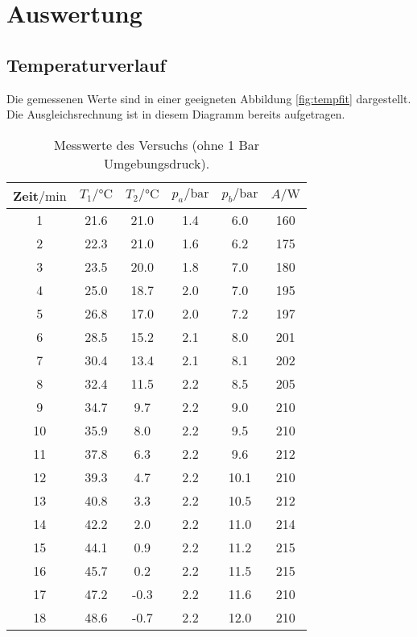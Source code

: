 \section{Auswertung}
\label{sec:Auswertung}
\subsection{Temperaturverlauf}
Die gemessenen Werte sind in einer geeigneten Abbildung \ref{fig:tempfit} dargestellt.
Die Ausgleichsrechnung ist in diesem Diagramm bereits aufgetragen.
\begin{table}[H]
    \centering
    \caption{Messwerte des Versuchs (ohne 1 Bar Umgebungsdruck).}
    \label{tab:t1}
    \begin{tabular}{S[table-format=2.0] S S[table-format=+2.2] S S S[table-format=3.0]}
        \toprule
        {Zeit$/\si{\minute}$} & {$T_1/\si{\celsius}$} & {$T_2/\si{\celsius}$} & {$p_a/\si{\bar}$} & {$p_b/\si{\bar}$} & {$A/\si{\watt}$}\\
           & 21.6  & 21.0  & 1.4   & 6.0   & 160   \\
        2   & 22.3  & 21.0  & 1.6   & 6.2   & 175   \\
        3   & 23.5  & 20.0  & 1.8   & 7.0   & 180   \\
        4   & 25.0  & 18.7  & 2.0   & 7.0   & 195   \\
        5   & 26.8  & 17.0  & 2.0   & 7.2   & 197   \\
        6   & 28.5  & 15.2  & 2.1   & 8.0   & 201   \\
        7   & 30.4  & 13.4  & 2.1   & 8.1   & 202   \\
        8   & 32.4  & 11.5  & 2.2   & 8.5   & 205   \\
        9   & 34.7  & 9.7   & 2.2   & 9.0   & 210   \\
        10  & 35.9  & 8.0   & 2.2   & 9.5   & 210   \\
        11  & 37.8  & 6.3   & 2.2   & 9.6   & 212   \\
        12  & 39.3  & 4.7   & 2.2   & 10.1  & 210   \\
        13  & 40.8  & 3.3   & 2.2   & 10.5  & 212   \\
        14  & 42.2  & 2.0   & 2.2   & 11.0  & 214   \\
        15  & 44.1  & 0.9   & 2.2   & 11.2  & 215   \\
        16  & 45.7  & 0.2   & 2.2   & 11.5  & 215   \\
        17  & 47.2  & -0.3  & 2.2   & 11.6  & 210   \\
        18  & 48.6  & -0.7  & 2.2   & 12.0  & 210   \\
        \bottomrule
    \end{tabular}
\end{table}

